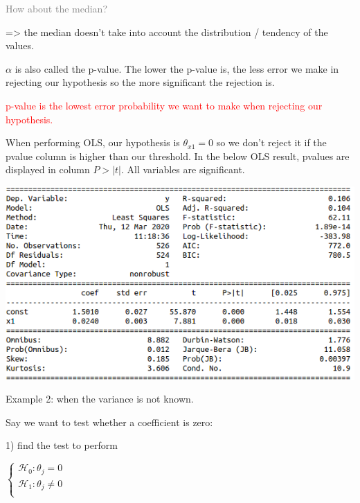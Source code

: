 \textcolor{gray}{How about the median?}

=> the median doesn't take into account the distribution / tendency of the values.

\vspace{5mm}

$\alpha$ is also called the p-value. The lower the p-value is, the less error we make in rejecting our hypothesis so the more significant the rejection is.

\textcolor{red}{p-value is the lowest error probability we want to make when rejecting our hypothesis.}

\vspace{5mm}

When performing OLS, our hypothesis is $\theta_{x1}=0$ so we don't reject it if the pvalue column is higher than our threshold. In the below OLS result, pvalues are displayed in column $P>|t|$. All variables are significant.

\begin{center}
\includegraphics[scale=0.5]{OLS_pvalue.png}
\end{center}

Example 2:  when the variance is not known.

\vspace{5mm}

Say we want to test whether a coefficient is zero:

1) find the test to perform

\vspace{5mm}

$
\left\{
    \begin{array}{ll}
        \mathcal{H}_0: \theta_j=0 \\
        \mathcal{H}_1: \theta_j \neq 0 \\
    \end{array}
\right.
$

